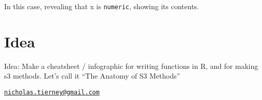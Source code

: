 In this case, revealing that x is \texttt{numeric}, showing its
contents.

\section{Idea}\label{idea}

Idea: Make a cheatsheet / infographic for writing functions in R, and
for making s3 methods. Let's call it ``The Anatomy of S3 Methods''

\address{%
Nicholas Tierney\\
Queensland University of Technology\\
Level 8, Y Block, Main Drive, QUT, Brisbane, Australia\\
}
\href{mailto:nicholas.tierney@gmail.com}{\nolinkurl{nicholas.tierney@gmail.com}}

